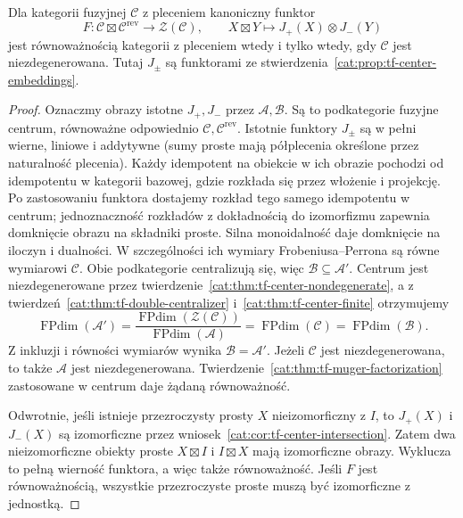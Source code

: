 \begin{twierdzenie}\label{cat:thm:tf-factorizable}
Dla kategorii fuzyjnej $\mathcal C$ z pleceniem kanoniczny funktor
\[
 F:\mathcal C\boxtimes\mathcal C^{\mathrm{rev}}\longrightarrow
 \mathcal Z(\mathcal C),\qquad
 X\boxtimes Y\longmapsto J_+(X)\otimes J_-(Y)
\]
jest równoważnością kategorii z pleceniem wtedy i tylko wtedy, gdy $\mathcal C$ jest niezdegenerowana. Tutaj $J_\pm$ są funktorami ze stwierdzenia~\ref{cat:prop:tf-center-embeddings}.
\end{twierdzenie}
\begin{proof}
Oznaczmy obrazy istotne $J_+,J_-$ przez $\mathcal A,\mathcal B$. Są to podkategorie fuzyjne centrum, równoważne odpowiednio $\mathcal C,\mathcal C^{\mathrm{rev}}$. Istotnie funktory $J_\pm$ są w pełni wierne, liniowe i addytywne (sumy proste mają półplecenia określone przez naturalność plecenia). Każdy idempotent na obiekcie w ich obrazie pochodzi od idempotentu w kategorii bazowej, gdzie rozkłada się przez włożenie i projekcję. Po zastosowaniu funktora dostajemy rozkład tego samego idempotentu w centrum; jednoznaczność rozkładów z dokładnością do izomorfizmu zapewnia domknięcie obrazu na składniki proste. Silna monoidalność daje domknięcie na iloczyn i dualności. W szczególności ich wymiary Frobeniusa--Perrona są równe wymiarowi $\mathcal C$. Obie podkategorie centralizują się, więc $\mathcal B\subseteq\mathcal A'$. Centrum jest niezdegenerowane przez twierdzenie~\ref{cat:thm:tf-center-nondegenerate}, a z twierdzeń~\ref{cat:thm:tf-double-centralizer} i~\ref{cat:thm:tf-center-finite} otrzymujemy
\[
 \operatorname{FPdim}(\mathcal A')
 =\frac{\operatorname{FPdim}(\mathcal Z(\mathcal C))}
 {\operatorname{FPdim}(\mathcal A)}
 =\operatorname{FPdim}(\mathcal C)
 =\operatorname{FPdim}(\mathcal B).
\]
Z inkluzji i równości wymiarów wynika $\mathcal B=\mathcal A'$. Jeżeli $\mathcal C$ jest niezdegenerowana, to także $\mathcal A$ jest niezdegenerowana. Twierdzenie~\ref{cat:thm:tf-muger-factorization} zastosowane w centrum daje żądaną równoważność.

Odwrotnie, jeśli istnieje przezroczysty prosty $X$ nieizomorficzny z $I$, to $J_+(X)$ i $J_-(X)$ są izomorficzne przez wniosek~\ref{cat:cor:tf-center-intersection}. Zatem dwa nieizomorficzne obiekty proste $X\boxtimes I$ i $I\boxtimes X$ mają izomorficzne obrazy. Wyklucza to pełną wierność funktora, a więc także równoważność. Jeśli $F$ jest równoważnością, wszystkie przezroczyste proste muszą być izomorficzne z jednostką.
\end{proof}

